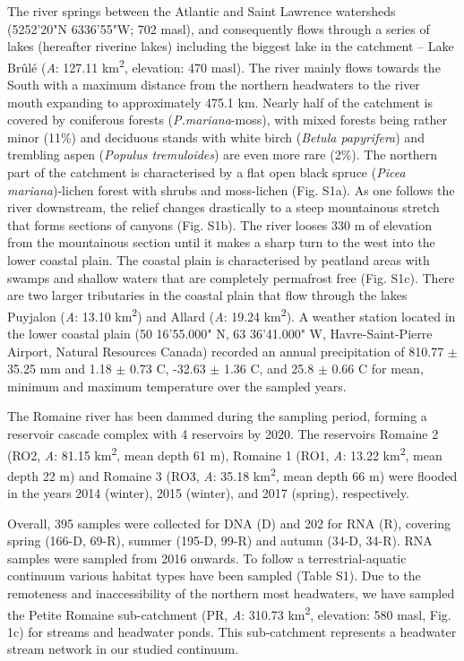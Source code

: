 \documentclass[12pt,a4paper]{article} %
\begin{document}
The river springs between the Atlantic and Saint Lawrence watersheds (52\textdegree{}52'20"N 63\textdegree{}36'55"W; 702 masl), and consequently flows through a series of lakes (hereafter riverine lakes) including the biggest lake in the catchment – Lake Br\^{u}l\'{e} (\textit{A}: 127.11 km\textsuperscript{2}, elevation: 470 masl). The river mainly flows towards the South with a maximum distance from the northern headwaters to the river mouth expanding to approximately 475.1 km. Nearly half of the catchment is covered by coniferous forests (\textit{P.mariana}-moss), with mixed forests being rather minor (11\%) and deciduous stands with white birch (\textit{Betula papyrifera}) and trembling aspen (\textit{Populus tremuloides}) are even more rare (2\%)\citep{HQreport2009}. The northern part of the catchment is characterised by a flat open black spruce (\textit{Picea mariana})-lichen forest with shrubs and moss-lichen (Fig. S1a). As one follows the river downstream, the relief changes drastically to a steep mountainous stretch that forms sections of canyons (Fig. S1b). The river looses 330 m of elevation from the mountainous section until it makes a sharp turn to the west into the lower coastal plain. The coastal plain is characterised by peatland areas with swamps and shallow waters that are completely permafrost free (Fig. S1c). There are two larger tributaries in the coastal plain that flow through the lakes Puyjalon (\textit{A}: 13.10 km\textsuperscript{2}) and Allard (\textit{A}: 19.24 km\textsuperscript{2}). A weather station located in the lower coastal plain (50\textdegree{} 16'55.000" N, 63\textdegree{} 36'41.000" W, Havre-Saint-Pierre Airport, Natural Resources Canada) recorded an annual precipitation of 810.77 $\pm$ 35.25 mm and 1.18 $\pm$ 0.73 \textdegree{}C, -32.63 $\pm$ 1.36 \textdegree{}C, and 25.8 $\pm$ 0.66 \textdegree{}C for mean, minimum and maximum temperature over the sampled years.

The Romaine river has been dammed during the sampling period, forming a reservoir cascade complex with 4 reservoirs by 2020. The reservoirs Romaine 2 (RO2, \textit{A}: 81.15 km\textsuperscript{2}, mean depth 61 m), Romaine 1 (RO1, \textit{A}: 13.22 km\textsuperscript{2}, mean depth 22 m) and Romaine 3 (RO3, \textit{A}: 35.18 km\textsuperscript{2}, mean depth 66 m) were flooded in the years 2014 (winter), 2015 (winter), and 2017 (spring), respectively.

Overall, 395 samples were collected for DNA (D) and 202 for RNA (R), covering spring (166-D, 69-R), summer (195-D, 99-R) and autumn (34-D, 34-R). RNA samples were sampled from 2016 onwards. To follow a terrestrial-aquatic continuum various habitat types have been sampled (Table S1). Due to the remoteness and inaccessibility of the northern most headwaters, we have sampled the Petite Romaine sub-catchment (PR, \textit{A}: 310.73 km\textsuperscript{2}, elevation: 580 masl, Fig. 1c) for streams and headwater ponds. This sub-catchment represents a headwater stream network in our studied continuum.
\end{document}
